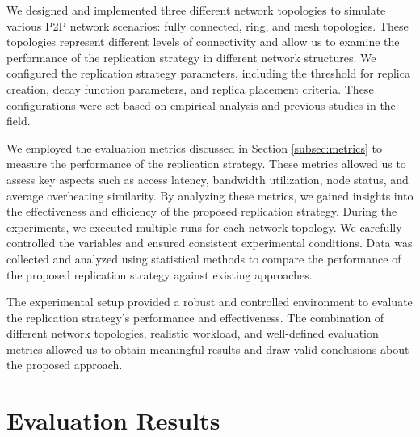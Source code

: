 \documentclass[10pt, conference]{IEEEtran}
\begin{document}
We designed and implemented three different network topologies to simulate various P2P network scenarios: fully connected, ring, and mesh topologies. These topologies represent different levels of connectivity and allow us to examine the performance of the replication strategy in different network structures.
We configured the replication strategy parameters, including the threshold for replica creation, decay function parameters, and replica placement criteria. These configurations were set based on empirical analysis and previous studies in the field.


We employed the evaluation metrics discussed in Section \ref{subsec:metrics} to measure the performance of the replication strategy. These metrics allowed us to assess key aspects such as access latency, bandwidth utilization, node status, and average overheating similarity. By analyzing these metrics, we gained insights into the effectiveness and efficiency of the proposed replication strategy.
During the experiments, we executed multiple runs for each network topology. We carefully controlled the variables and ensured consistent experimental conditions. Data was collected and analyzed using statistical methods to compare the performance of the proposed replication strategy against existing approaches.

The experimental setup provided a robust and controlled environment to evaluate the replication strategy's performance and effectiveness. The combination of different network topologies, realistic workload, and well-defined evaluation metrics allowed us to obtain meaningful results and draw valid conclusions about the proposed approach.


\section{Evaluation Results}\label{sec:results}
\end{document}
